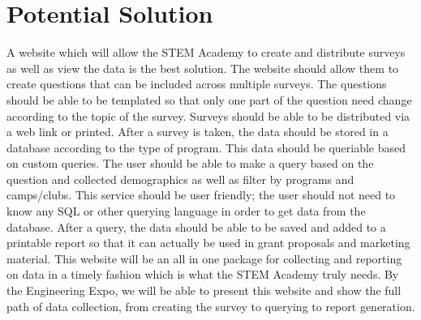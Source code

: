 \documentclass[draftclsnofoot,onecolumn,notitlepage]{article}
\begin{document}
\section{Potential Solution}
A website which will allow the STEM Academy to create and distribute surveys as well as view the data is the best solution. The website should allow them to create questions that can be included across multiple surveys. The questions should be able to be templated so that only one part of the question need change according to the topic of the survey. Surveys should be able to be distributed via a web link or printed. After a survey is taken, the data should be stored in a database according to the type of program. This data should be queriable based on custom queries. The user should be able to make a query based on the question and collected demographics as well as filter by programs and camps/clubs. This service should be user friendly; the user should not need to know any SQL or other querying language in order to get data from the database. After a query, the data should be able to be saved and added to a printable report so that it can actually be used in grant proposals and marketing material. This website will be an all in one package for collecting and reporting on data in a timely fashion which is what the STEM Academy truly needs. By the Engineering Expo, we will be able to present this website and show the full path of data collection, from creating the survey to querying to report generation.
\end{document}
